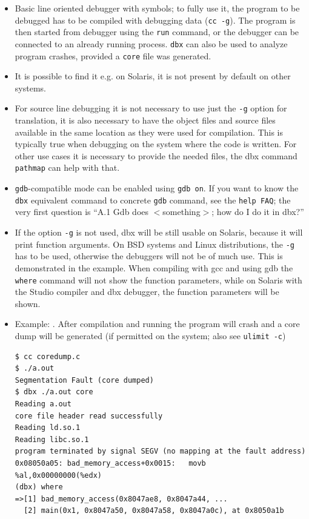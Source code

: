 \begin{itemize}
\item Basic line oriented debugger with symbols; to fully use it, the program to
be debugged has to be compiled with debugging data (\texttt{cc -g}). The program
is then started from debugger using the \texttt{run} command, or the debugger
can be connected to an already running process. \texttt{dbx} can also be used to
analyze program crashes, provided a \texttt{core} file was generated.
\item It is possible to find it e.g. on Solaris, it is not present by default
on other systems.
\item For source line debugging it is not necessary to use just the \texttt{-g}
option for translation, it is also necessary to have the object files and source
files available in the same location as they were used for compilation.
This is typically true when debugging on the system where the code is written.
For other use cases it is necessary to provide the needed files, the dbx
command \texttt{pathmap} can help with that.
\item \texttt{gdb}-compatible mode can be enabled using \texttt{gdb on}.
If you want to know the \texttt{dbx} equivalent command to concrete
\texttt{gdb} command, see the \texttt{help FAQ}; the very first question is
``A.1  Gdb does $<$something$>$; how do I do it in dbx?''
\item If the option \texttt{-g} is not used, dbx will be still usable on
Solaris, because it will print function arguments. On BSD systems and Linux
distributions, the \texttt{-g} has to be used, otherwise the debuggers will not
be of much use. This is demonstrated in the  example.
When compiling with gcc and using gdb the \texttt{where} command will not show
the function parameters, while on Solaris with the Studio compiler and dbx
debugger, the function parameters will be shown.
\item Example: . After compilation and running the
program will crash and a core dump will be generated (if permitted on the system;
also see \texttt{ulimit -c})

\begin{verbatim}
$ cc coredump.c
$ ./a.out 
Segmentation Fault (core dumped)
$ dbx ./a.out core
Reading a.out
core file header read successfully
Reading ld.so.1
Reading libc.so.1
program terminated by signal SEGV (no mapping at the fault address)
0x08050a05: bad_memory_access+0x0015:   movb     %al,0x00000000(%edx)
(dbx) where                                                                  
=>[1] bad_memory_access(0x8047ae8, 0x8047a44, ...
  [2] main(0x1, 0x8047a50, 0x8047a58, 0x8047a0c), at 0x8050a1b 
\end{verbatim}


\end{itemize}
